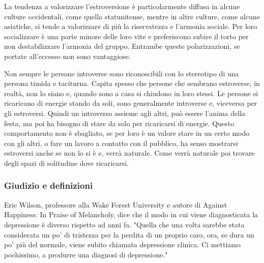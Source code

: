 \documentclass[12pt]{book} %
\begin{document}
\begin{mdframed}[linewidth=1pt]
La tendenza a valorizzare l’estroversione è particolarmente diffusa in alcune culture occidentali, come quella statunitense, mentre in altre culture, come alcune asiatiche, si tende a valorizzare di più la riservatezza e l’armonia sociale. Per loro socializzare è una parte
minore delle loro vite e preferiscono subire il torto per non destabilizzare l'armonia del gruppo. Entrambe queste
polarizzazioni, se portate all'eccesso non sono vantaggiose.

Non sempre le persone introverse sono riconoscibili con lo stereotipo di una persona timida e taciturna. Capita spesso
che persone che sembrano estroverse, in realtà, non lo siano e, quando sono a casa si chiudono in loro stessi. 
Le persone si ricaricano di energie stando da soli, sono generalmente introverse e, viceversa per gli estroversi. Quindi un introverso assieme agli altri,
può essere l'anima della festa, ma poi ha bisogno di stare da solo per ricaricarsi di energie. Questo
comportamento non è sbagliato, se per loro è un valore stare in un certo modo con gli altri, o fare un lavoro a contatto
con il pubblico, ha senso mostrarsi estroversi anche se non lo si è e, verrà naturale. Come verrà naturale poi trovare
degli spazi di solitudine dove ricaricarsi.
\end{mdframed}

\subsubsection{Giudizio e definizioni}
Eric Wilson, professore alla Wake Forest University e autore di Against Happiness: In Praise of Melancholy, dice che il
modo in cui viene diagnosticata la depressione è diverso rispetto ad anni fa. "Quella che una volta
sarebbe stata considerata un po' di tristezza per la perdita di un proprio caro, ora, se dura un po' più del normale,
viene subito chiamata depressione clinica. Ci mettiamo pochissimo, a produrre una diagnosi di
depressione."
\end{document}
